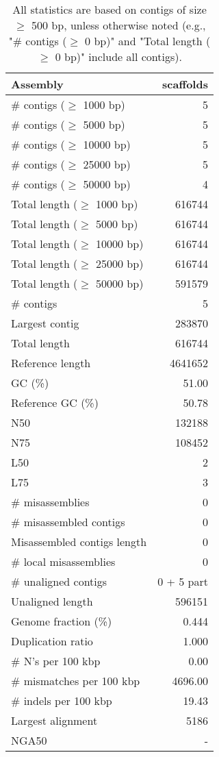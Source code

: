 \documentclass[12pt,a4paper]{article}
\begin{document}
\begin{table}[ht]
\begin{center}
\caption{All statistics are based on contigs of size $\geq$ 500 bp, unless otherwise noted (e.g., "\# contigs ($\geq$ 0 bp)" and "Total length ($\geq$ 0 bp)" include all contigs).}
\begin{tabular}{|l*{1}{|r}|}
\hline
Assembly & scaffolds \\ \hline
\# contigs ($\geq$ 1000 bp) & 5 \\ \hline
\# contigs ($\geq$ 5000 bp) & 5 \\ \hline
\# contigs ($\geq$ 10000 bp) & 5 \\ \hline
\# contigs ($\geq$ 25000 bp) & 5 \\ \hline
\# contigs ($\geq$ 50000 bp) & 4 \\ \hline
Total length ($\geq$ 1000 bp) & 616744 \\ \hline
Total length ($\geq$ 5000 bp) & 616744 \\ \hline
Total length ($\geq$ 10000 bp) & 616744 \\ \hline
Total length ($\geq$ 25000 bp) & 616744 \\ \hline
Total length ($\geq$ 50000 bp) & 591579 \\ \hline
\# contigs & 5 \\ \hline
Largest contig & 283870 \\ \hline
Total length & 616744 \\ \hline
Reference length & 4641652 \\ \hline
GC (\%) & 51.00 \\ \hline
Reference GC (\%) & 50.78 \\ \hline
N50 & 132188 \\ \hline
N75 & 108452 \\ \hline
L50 & 2 \\ \hline
L75 & 3 \\ \hline
\# misassemblies & 0 \\ \hline
\# misassembled contigs & 0 \\ \hline
Misassembled contigs length & 0 \\ \hline
\# local misassemblies & 0 \\ \hline
\# unaligned contigs & 0 + 5 part \\ \hline
Unaligned length & 596151 \\ \hline
Genome fraction (\%) & 0.444 \\ \hline
Duplication ratio & 1.000 \\ \hline
\# N's per 100 kbp & 0.00 \\ \hline
\# mismatches per 100 kbp & 4696.00 \\ \hline
\# indels per 100 kbp & 19.43 \\ \hline
Largest alignment & 5186 \\ \hline
NGA50 & - \\ \hline
\end{tabular}
\end{center}
\end{table}
\end{document}
